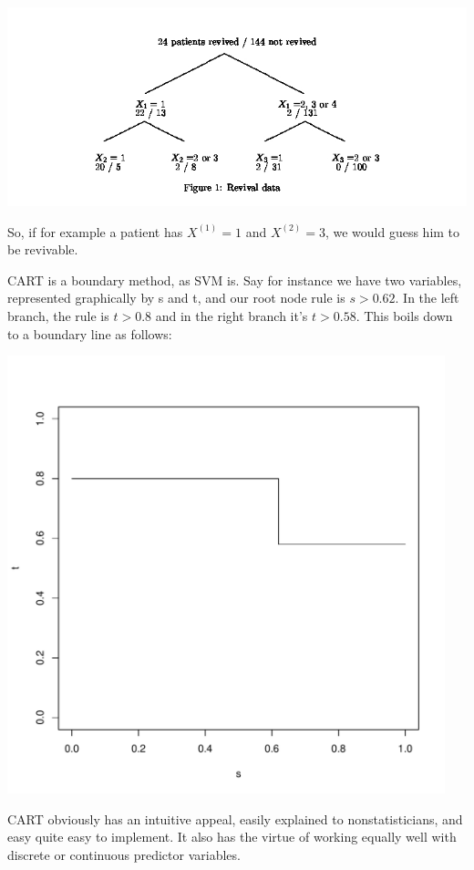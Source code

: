 \includegraphics[width=7.0in]{RPart.jpg}

So, if for example a patient has $X^{(1)}=1$ and $X^{(2)} = 3$, we would
guess him to be revivable.

CART is a boundary method, as SVM is.  Say for instance we have two
variables, represented graphically by s and t, and our root node rule is
$s > 0.62$.  In the left branch, the rule is $t > 0.8$ and in the right
branch it's $t > 0.58$.  This boils down to a boundary line as follows:

\includegraphics[width=5.0in]{CARTBound.pdf}

CART obviously has an intuitive appeal, easily explained to
nonstatisticians, and easy quite easy to implement.  It also has the
virtue of working equally well with discrete or continuous predictor
variables.


